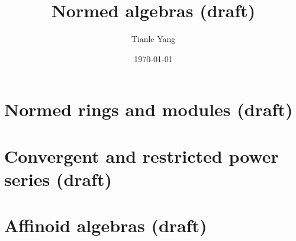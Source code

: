 \documentclass[sectionlevel=chapter]{noteformyself}
\title{Normed algebras (draft)}
\author{Tianle Yang}
\date{\today}
\begin{document}
    \maketitle

    \tableofcontents

    \section{Normed rings and modules (draft)}
    
    \section{Convergent and restricted power series (draft)}
    
    \section{Affinoid algebras (draft)}
    

    
\end{document}
